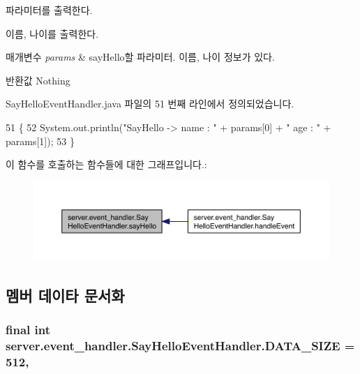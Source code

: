 파라미터를 출력한다. 

이름, 나이를 출력한다. 
\begin{DoxyParams}{매개변수}
{\em params} & say\-Hello할 파라미터. 이름, 나이 정보가 있다. \\
\hline
\end{DoxyParams}
\begin{DoxyReturn}{반환값}
Nothing 
\end{DoxyReturn}


Say\-Hello\-Event\-Handler.\-java 파일의 51 번째 라인에서 정의되었습니다.


\begin{DoxyCode}
51                                           \{
52         System.out.println(\textcolor{stringliteral}{"SayHello -> name : "} + params[0] + \textcolor{stringliteral}{" age : "} + params[1]);
53     \}
\end{DoxyCode}


이 함수를 호출하는 함수들에 대한 그래프입니다.\-:\nopagebreak
\begin{figure}[H]
\begin{center}
\leavevmode
\includegraphics[width=350pt]{classserver_1_1event__handler_1_1_say_hello_event_handler_a4a7b66fe140acb1a9c9b68f1a14d166f_icgraph}
\end{center}
\end{figure}




\subsection{멤버 데이타 문서화}
\hypertarget{classserver_1_1event__handler_1_1_say_hello_event_handler_ac00b2a94cbac1b91e85325d3a119c7e0}{
\subsubsection[{D\-A\-T\-A\-\_\-\-S\-I\-Z\-E}]{\setlength{\rightskip}{0pt plus 5cm}final int server.\-event\-\_\-handler.\-Say\-Hello\-Event\-Handler.\-D\-A\-T\-A\-\_\-\-S\-I\-Z\-E = 512\hspace{0.3cm}{\ttfamily [static]}, {\ttfamily [private]}}}\label{classserver_1_1event__handler_1_1_say_hello_event_handler_ac00b2a94cbac1b91e85325d3a119c7e0}



